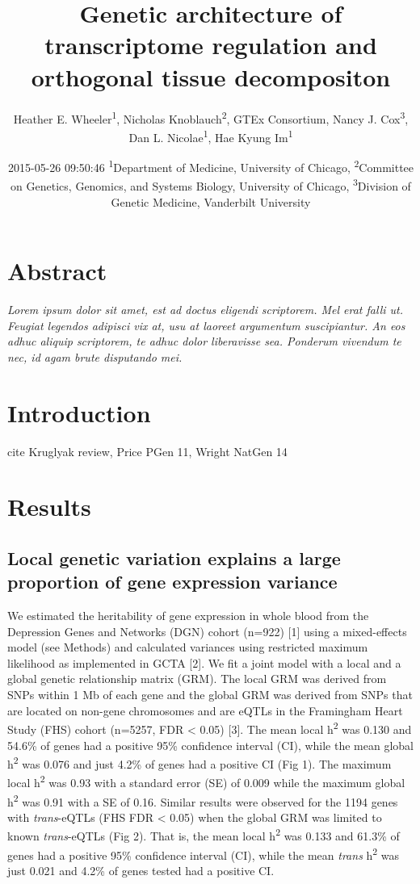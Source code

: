 \documentclass[]{article}
\title{Genetic architecture of transcriptome regulation and orthogonal tissue
decompositon}
\author{Heather E. Wheeler\textsuperscript{1}, Nicholas
Knoblauch\textsuperscript{2}, GTEx Consortium, Nancy J.
Cox\textsuperscript{3}, Dan L. Nicolae\textsuperscript{1}, Hae Kyung
Im\textsuperscript{1}}
\date{2015-05-26 09:50:46 \textsuperscript{1}Department of Medicine,
University of Chicago, \textsuperscript{2}Committee on Genetics,
Genomics, and Systems Biology, University of Chicago,
\textsuperscript{3}Division of Genetic Medicine, Vanderbilt University}
\begin{document}
\maketitle


\section{Abstract}\label{abstract}

\emph{Lorem ipsum dolor sit amet, est ad doctus eligendi scriptorem. Mel
erat falli ut. Feugiat legendos adipisci vix at, usu at laoreet
argumentum suscipiantur. An eos adhuc aliquip scriptorem, te adhuc dolor
liberavisse sea. Ponderum vivendum te nec, id agam brute disputando
mei.}

\section{Introduction}\label{introduction}

cite Kruglyak review, Price PGen 11, Wright NatGen 14

\section{Results}\label{results}

\subsection{Local genetic variation explains a large proportion of gene
expression
variance}\label{local-genetic-variation-explains-a-large-proportion-of-gene-expression-variance}

We estimated the heritability of gene expression in whole blood from the
Depression Genes and Networks (DGN) cohort (n=922) {[}1{]} using a
mixed-effects model (see Methods) and calculated variances using
restricted maximum likelihood as implemented in GCTA {[}2{]}. We fit a
joint model with a local and a global genetic relationship matrix (GRM).
The local GRM was derived from SNPs within 1 Mb of each gene and the
global GRM was derived from SNPs that are located on non-gene
chromosomes and are eQTLs in the Framingham Heart Study (FHS) cohort
(n=5257, FDR \textless{} 0.05) {[}3{]}. The mean local
h\textsuperscript{2} was 0.130 and 54.6\% of genes had a positive 95\%
confidence interval (CI), while the mean global h\textsuperscript{2} was
0.076 and just 4.2\% of genes had a positive CI (Fig 1). The maximum
local h\textsuperscript{2} was 0.93 with a standard error (SE) of 0.009
while the maximum global h\textsuperscript{2} was 0.91 with a SE of
0.16. Similar results were observed for the 1194 genes with
\emph{trans}-eQTLs (FHS FDR \textless{} 0.05) when the global GRM was
limited to known \emph{trans}-eQTLs (Fig 2). That is, the mean local
h\textsuperscript{2} was 0.133 and 61.3\% of genes had a positive 95\%
confidence interval (CI), while the mean \emph{trans}
h\textsuperscript{2} was just 0.021 and 4.2\% of genes tested had a
positive CI.
\end{document}
